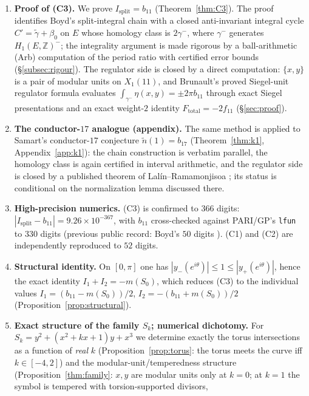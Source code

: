 \documentclass[11pt]{amsart}
\theoremstyle{definition}
\theoremstyle{remark}
\newcommand{\Z}{\mathbb{Z}}
\begin{document}
\begin{enumerate}
  \item \textbf{Proof of (C3).} We prove
  $I_{\mathrm{split}}=b_{11}$ (Theorem~\ref{thm:C3}). The proof identifies
  Boyd's split-integral chain with a closed anti-invariant integral cycle
  $C'=\tilde\gamma+\beta_0$ on $E$ whose homology class is $2\gamma^-$, where
  $\gamma^-$ generates $H_1(E,\Z)^-$; the integrality argument is made
  rigorous by a ball-arithmetic (Arb) computation of the period ratio with
  certified error bounds (\S\ref{subsec:rigour}). The regulator side
  is closed by a direct computation: $\{x,y\}$ is a pair of modular units
  on $X_1(11)$, and Brunault's proved Siegel-unit regulator formula
  \cite{BrunaultSiegel} evaluates $\int_{\gamma^-}\eta(x,y)=\pm2\pi b_{11}$
  through exact Siegel presentations and an exact weight-$2$ identity
  $F_{\mathrm{total}}=-2f_{11}$ (\S\ref{sec:proof}).
  \item \textbf{The conductor-$17$ analogue (appendix).} The same method is
  applied to Samart's conductor-$17$ conjecture $\tilde n(1)=b_{17}$
  (Theorem~\ref{thm:k1}, Appendix~\ref{app:k1}): the chain construction is
  verbatim parallel, the homology class is again certified in interval
  arithmetic, and the regulator side is closed by a published theorem of
  Lal\'in--Ramamonjisoa \cite{LalinRam}; its status is conditional on the
  normalization lemma discussed there.
  \item \textbf{High-precision numerics.} (C3) is confirmed to $366$ digits:
  $|I_{\mathrm{split}}-b_{11}|=9.26\times10^{-367}$, with $b_{11}$
  cross-checked against PARI/GP's \texttt{lfun} to $330$ digits (previous
  public record: Boyd's $50$ digits \cite[p.~28]{Boyd2015}). (C1) and
  (C2) are independently reproduced to $52$ digits.
  \item \textbf{Structural identity.} On $[0,\pi]$ one has
  $|y_-(e^{i\theta})|\le 1\le |y_+(e^{i\theta})|$, hence the exact identity
  $I_1+I_2=-m(S_0)$, which reduces (C3) to the individual values
  $I_1=(b_{11}-m(S_0))/2$, $I_2=-(b_{11}+m(S_0))/2$
  (Proposition~\ref{prop:structural}).
  \item \textbf{Exact structure of the family $S_k$; numerical dichotomy.}
  For $S_k=y^2+(x^2+kx+1)y+x^3$ we determine exactly the torus intersections
  as a function of \emph{real} $k$ (Proposition~\ref{prop:torus}: the torus
  meets the curve iff $k\in[-4,2]$) and the modular-unit/temperedness
  structure (Proposition~\ref{thm:family}: $x,y$ are modular units only at
  $k=0$; at $k=1$ the symbol is tempered with torsion-supported divisors,

\end{enumerate}
\end{document}
